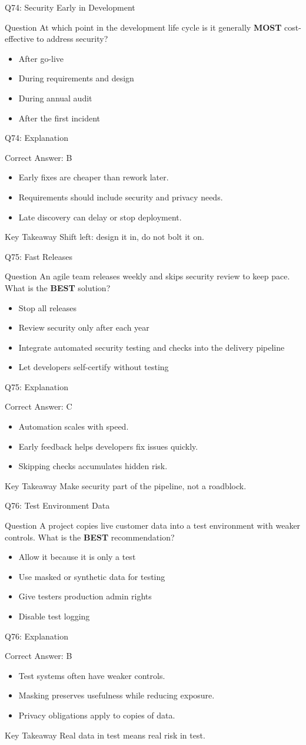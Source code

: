 \documentclass[aspectratio=169]{beamer}
\newcommand{\hq}[7]{%
	\begin{frame}{Q#1: #2}
		\begin{block}{Question}
			#3
		\end{block}
		\begin{itemize}
			#4
		\end{itemize}
	\end{frame}
	\begin{frame}{Q#1: Explanation}
		\begin{block}{Correct Answer: #5}
			\begin{itemize}
				#6
			\end{itemize}
		\end{block}
		\begin{alertblock}{Key Takeaway}
			#7
		\end{alertblock}
	\end{frame}
}
\begin{document}
	\hq{74}{Security Early in Development}
	{At which point in the development life cycle is it generally \textbf{MOST} cost-effective to address security?}
	{\item[\textbf{(A)}] After go-live
		\item[\textbf{(B)}] During requirements and design
		\item[\textbf{(C)}] During annual audit
		\item[\textbf{(D)}] After the first incident}
	{B}
	{\item Early fixes are cheaper than rework later.
		\item Requirements should include security and privacy needs.
		\item Late discovery can delay or stop deployment.}
	{Shift left: design it in, do not bolt it on.}
	
	\hq{75}{Fast Releases}
	{An agile team releases weekly and skips security review to keep pace. What is the \textbf{BEST} solution?}
	{\item[\textbf{(A)}] Stop all releases
		\item[\textbf{(B)}] Review security only after each year
		\item[\textbf{(C)}] Integrate automated security testing and checks into the delivery pipeline
		\item[\textbf{(D)}] Let developers self-certify without testing}
	{C}
	{\item Automation scales with speed.
		\item Early feedback helps developers fix issues quickly.
		\item Skipping checks accumulates hidden risk.}
	{Make security part of the pipeline, not a roadblock.}
	
	\hq{76}{Test Environment Data}
	{A project copies live customer data into a test environment with weaker controls. What is the \textbf{BEST} recommendation?}
	{\item[\textbf{(A)}] Allow it because it is only a test
		\item[\textbf{(B)}] Use masked or synthetic data for testing
		\item[\textbf{(C)}] Give testers production admin rights
		\item[\textbf{(D)}] Disable test logging}
	{B}
	{\item Test systems often have weaker controls.
		\item Masking preserves usefulness while reducing exposure.
		\item Privacy obligations apply to copies of data.}
	{Real data in test means real risk in test.}
	
\end{document}

